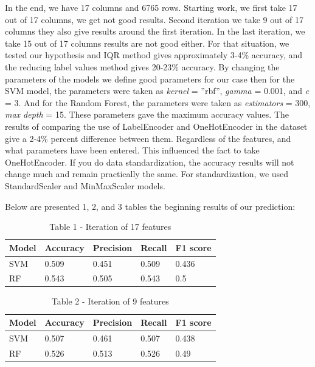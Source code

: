 In the end, we have 17 columns and 6765 rows. Starting work, we first
take 17 out of 17 columns, we get not good results. Second iteration we
take 9 out of 17 columns they also give results around the first
iteration. In the last iteration, we take 15 out of 17 columns results
are not good either. For that situation, we tested our hypothesis and
IQR method gives approximately 3-4\% accuracy, and the reducing label
values method gives 20-23\% accuracy. By changing the parameters of the
models we define good parameters for our case then for the SVM model,
the parameters were taken as \emph{kernel} = ''rbf'', \emph{gamma} =
0.001, and \emph{c} = 3. And for the Random Forest, the parameters were
taken as \emph{estimators} = 300, \emph{max depth} = 15. These
parameters gave the maximum accuracy values. The results of comparing
the use of LabelEncoder and OneHotEncoder in the dataset give a 2-4\%
percent difference between them. Regardless of the features, and what
parameters have been entered. This influenced the fact to take
OneHotEncoder. If you do data standardization, the accuracy results will
not change much and remain practically the same. For standardization, we
used StandardScaler and MinMaxScaler models.

Below are presented 1, 2, and 3 tables the beginning results of our
prediction:



\begin{table}[H]
\caption*{Table 1 - Iteration of 17 features}
\centering
\begin{tabular}{|l|l|l|l|l|}
\hline
Model & Accuracy & Precision & Recall & F1 				score \\ \hline
SVM   & 0.509    & 0.451     & 0.509  & 0.436        \\ \hline
RF    & 0.543    & 0.505     & 0.543  & 0.5          \\ \hline
\end{tabular}
\end{table}

\begin{table}[H]
\caption*{Table 2 - Iteration of 9 features}
\centering
\begin{tabular}{|l|l|l|l|l|}
\hline
Model & Accuracy & Precision & Recall & F1 				score \\ \hline
SVM   & 0.507    & 0.461     & 0.507  & 0.438        \\ \hline
RF    & 0.526    & 0.513     & 0.526  & 0.49         \\ \hline
\end{tabular}
\end{table}

